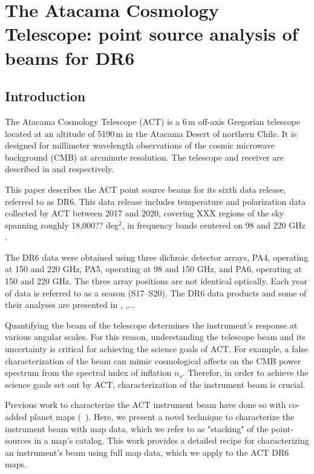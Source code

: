 \chapter{The Atacama Cosmology Telescope: point source analysis of beams for DR6}
\label{ch:actbeams}
\section{Introduction}
\label{sec:act_intro}

The Atacama Cosmology Telescope (ACT) is a 6\,m off-axis Gregorian telescope located at an altitude of 5190\,m in the Atacama Desert of northern Chile. It is designed for millimeter wavelength observations of the cosmic microwave background (CMB) at arcminute resolution.  The telescope and receiver are described in \cite{fowler_2007} and \cite{thornton_2016} respectively. 

This paper describes the ACT point source beams for its sixth data release, referred to as DR6. This data release includes temperature and polarization data collected by ACT between 2017 and 2020, covering XXX regions of the sky spanning roughly 18,000?? deg$^2$, in frequency bands centered on 98 and 220 GHz \citep{thornton_2016}.

The DR6 data were obtained using three dichroic detector arrays, PA4, operating at 150 and 220 GHz, PA5, operating at 98 and 150 GHz, and PA6, operating at 150 and 220 GHz.  The three array positions are not identical optically. Each year of data is referred to as a season (S17--S20).  The DR6 data products and some of their analyses are presented in  \cite{XXX}, \cite{aiola_2020},... 

Quantifying the beam of the telescope determines the instrument's response at various angular scales.  For this reason, understanding the telescope beam and its uncertainty is critical for achieving the science goals of ACT.  For example, a false characterization of the beam can mimic cosmological affects on the CMB power spectrum from the spectral index of inflation $n_s$.  Therefor, in order to achieve the science goals set out by ACT, characterization of the instrument beam is crucial.

Previous work to characterize the ACT instrument beam have done so with co-added planet maps (~\cite{hasselfield_atacama_2013,louis_2017,naess_2014}).  Here, we present a novel technique to characterize the instrument beam with map data, which we refer to as "stacking" of the point-sources in a map's catalog.  This work provides a detailed recipe for characterizing an instrument's beam using full map data, which we apply to the ACT DR6 maps.

